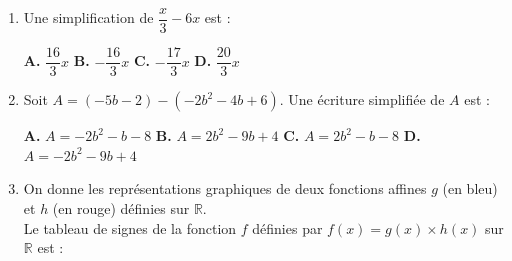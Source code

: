 \documentclass[a4paper,11pt]{article}
\begin{document}
\begin{seanceD}{} %

\begin{enumerate}
\item Une simplification de $\dfrac{x}{3}-6x$ est :

\begin{center}
\textbf{\textcolor{Couleur1}{A.}} $\dfrac{16}{3}x$ \qquad \textbf{\textcolor{Couleur1}{B.}} $-\dfrac{16}{3}x$ \qquad \textbf{\textcolor{Couleur1}{C.}} $-\dfrac{17}{3}x$ \qquad \textbf{\textcolor{Couleur1}{D.}} $\dfrac{20}{3}x$
\end{center}


\item Soit $A= (-5b-2) - (-2b^2-4b+6)$. Une écriture simplifiée de $A$ est :


\begin{center}
\textbf{\textcolor{Couleur1}{A.}} $A=-2b^2-b-8$ \qquad \textbf{\textcolor{Couleur1}{B.}} $A=2b^2-9b+4$ \qquad \textbf{\textcolor{Couleur1}{C.}} $A=2b^2-b-8$ \qquad \textbf{\textcolor{Couleur1}{D.}} $A=-2b^2-9b+4$
\end{center}


\item On donne les représentations graphiques de deux fonctions affines $g$ (en bleu) et $h$ (en rouge) définies sur $\mathbb{R}$.\\
Le tableau de signes de la fonction $f$ définies par $f(x)=g(x)\times h(x)$ sur $\mathbb{R}$ est  :\\
\begin{minipage}[c]{0.4\textwidth}
    \begin{tikzpicture}[baseline,scale = 0.5]


\end{tikzpicture}
\end{minipage}
\end{enumerate}
\end{seanceD}
\end{document}
